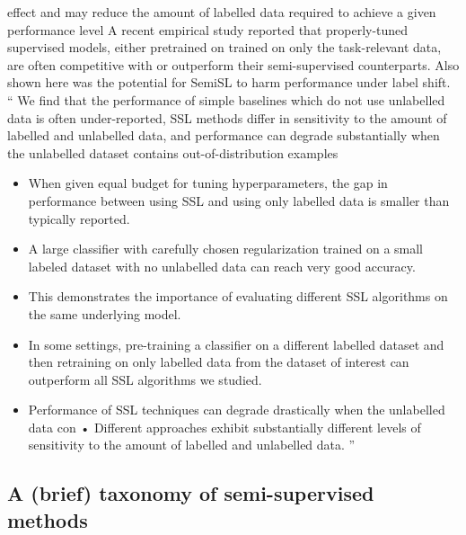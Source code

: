 \begin{itemize}
          effect and may reduce the amount of labelled data required to achieve a given performance
          level \citep{chapelle2009semi}
          A recent empirical study \citep{oliver2018realistic} reported that properly-tuned
          supervised models, either pretrained on trained on only the task-relevant data, are often
          competitive with or outperform their semi-supervised counterparts. Also shown here was
          the potential for SemiSL to harm performance under label shift.
          ``
          We find that the performance of simple baselines which do not use unlabelled data is
          often under-reported, SSL methods differ in sensitivity to the amount of labelled and
          unlabelled data, and performance can degrade substantially when the unlabelled dataset
          contains out-of-distribution examples
          \begin{itemize}
            \item When given equal budget for tuning hyperparameters, the gap in performance
              between using SSL and using only labelled data is smaller than typically reported.
            \item A large classifier with carefully chosen regularization trained on a small
              labeled dataset with no unlabelled data can reach very good accuracy.
            \item This demonstrates the importance of evaluating different SSL algorithms on the
              same underlying model.
            \item In some settings, pre-training a classifier on a different labelled dataset and
              then retraining on only labelled data from the dataset of interest can outperform all
              SSL algorithms we studied.
            \item Performance of SSL techniques can degrade drastically when the unlabelled data
              con • Different approaches exhibit substantially different levels of sensitivity to
              the amount of labelled and unlabelled data.
          ''
\end{itemize}


\subsection{A (brief) taxonomy of semi-supervised methods}


\end{itemize}
